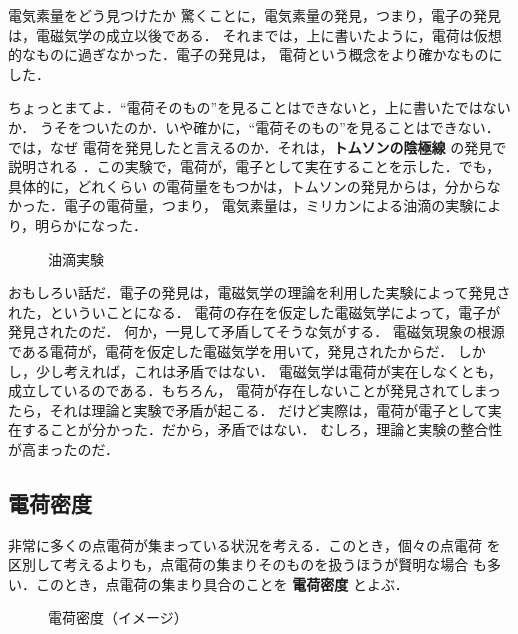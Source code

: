         \begin{memo}{電気素量をどう見つけたか}
            驚くことに，電気素量の発見，つまり，電子の発見は，電磁気学の成立以後である．
            それまでは，上に書いたように，電荷は仮想的なものに過ぎなかった．電子の発見は，
            電荷という概念をより確かなものにした．

            ちょっとまてよ．“電荷そのもの”を見ることはできないと，上に書いたではないか．
            うそをついたのか．いや確かに，“電荷そのもの”を見ることはできない．では，なぜ
            電荷を発見したと言えるのか．それは，\textbf{トムソンの陰極線} の発見で説明される
            ．この実験で，電荷が，電子として実在することを示した．でも，具体的に，どれくらい
            の電荷量をもつかは，トムソンの発見からは，分からなかった．電子の電荷量，つまり，
            電気素量は，ミリカンによる油滴の実験により，明らかになった．
                \begin{figure}[hbt]
                    \begin{center}
                        \caption{油滴実験}
                        \label{fig:denkisoryou}
                    \end{center}
                \end{figure}

            おもしろい話だ．電子の発見は，電磁気学の理論を利用した実験によって発見された，といういことになる．
            電荷の存在を仮定した電磁気学によって，電子が発見されたのだ．
            何か，一見して矛盾してそうな気がする．
            電磁気現象の根源である電荷が，電荷を仮定した電磁気学を用いて，発見されたからだ．
            しかし，少し考えれば，これは矛盾ではない．
            電磁気学は電荷が実在しなくとも，成立しているのである．もちろん，
            電荷が存在しないことが発見されてしまったら，それは理論と実験で矛盾が起こる．
            だけど実際は，電荷が電子として実在することが分かった．だから，矛盾ではない．
            むしろ，理論と実験の整合性が高まったのだ．
        \end{memo}

    \subsection{電荷密度}
    非常に多くの点電荷が集まっている状況を考える．このとき，個々の点電荷
    を区別して考えるよりも，点電荷の集まりそのものを扱うほうが賢明な場合
    も多い．このとき，点電荷の集まり具合のことを \textbf{電荷密度} とよぶ．
        \begin{figure}[hbt]
            \begin{center}
                \caption{電荷密度（イメージ）}
                \label{fig:EM_DenkaMitudo}
            \end{center}
        \end{figure}


